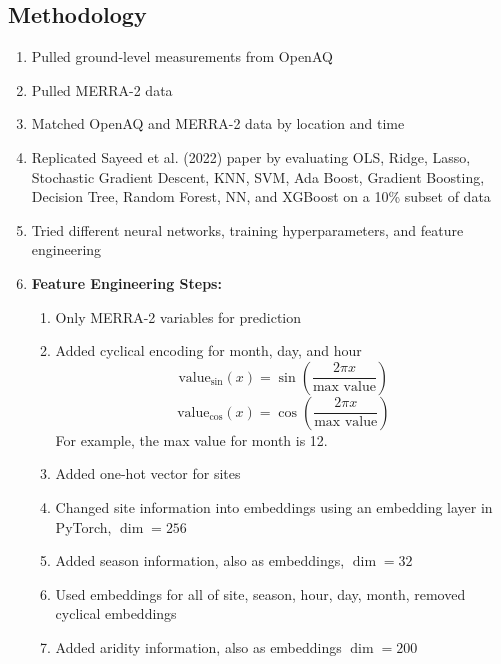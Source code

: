 \documentclass[draft]{agujournal2019}
\begin{document}
\subsection{Methodology}

\begin{enumerate}
    \item Pulled ground-level measurements from OpenAQ
    \item Pulled MERRA-2 data
    \item Matched OpenAQ and MERRA-2 data by location and time
    \item Replicated Sayeed et al. (2022) paper by evaluating OLS, Ridge, Lasso, Stochastic Gradient Descent, KNN, SVM, Ada Boost, Gradient Boosting, Decision Tree, Random Forest, NN, and XGBoost on a 10\% subset of data
    \item Tried different neural networks, training hyperparameters, and feature engineering
    \item \textbf{Feature Engineering Steps:}
    \begin{enumerate}
        \item Only MERRA-2 variables for prediction
        \item Added cyclical encoding for month, day, and hour
        \[\text{value}_{\sin}(x) = \sin \left(\frac{2\pi x}{\text{max value}}\right) \]
        \[\text{value}_{\cos}(x) = \cos \left(\frac{2\pi x}{\text{max value}}\right)\]
        For example, the max value for month is 12.
        \item Added one-hot vector for sites
        \item Changed site information into embeddings using an embedding layer in PyTorch, \(\dim = 256\)
        \item Added season information, also as embeddings, \(\dim = 32\)
        \item Used embeddings for all of site, season, hour, day, month, removed cyclical embeddings
        \item Added aridity information, also as embeddings \(\dim = 200\)
    \end{enumerate}
\end{enumerate}

\pagebreak
\end{document}
